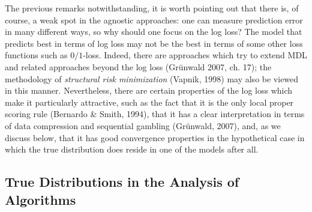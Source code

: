 \documentclass[authoryear]{elsarticle}
\begin{document}
The previous remarks notwithstanding, it is worth pointing out that there
is, of course, a weak spot in the agnostic approaches: one can
measure prediction error in many different ways, so why should one
focus on the log loss? The model that predicts best in terms of log
loss may not be the best in terms of some other loss functions such as
$0/1$-loss. Indeed, there are approaches which try to extend MDL and
related approaches beyond the log loss (Gr\"unwald 2007, ch.  17); the
methodology of {\em structural risk minimization\/} (Vapnik, 1998) may
also be viewed in this manner.  Nevertheless, there are certain
properties of the log loss which make it particularly attractive, such
as the fact that it is the only local proper scoring rule (Bernardo \&
Smith, 1994), that it has a clear interpretation in terms of data
compression and sequential gambling (Gr\"unwald, 2007), and, as we
discuss below, that it has good convergence properties in the
hypothetical case in which the true distribution does reside in one of
the models after all.

\subsection{True Distributions in the Analysis of Algorithms}
\label{sec:analysis}
\end{document}
